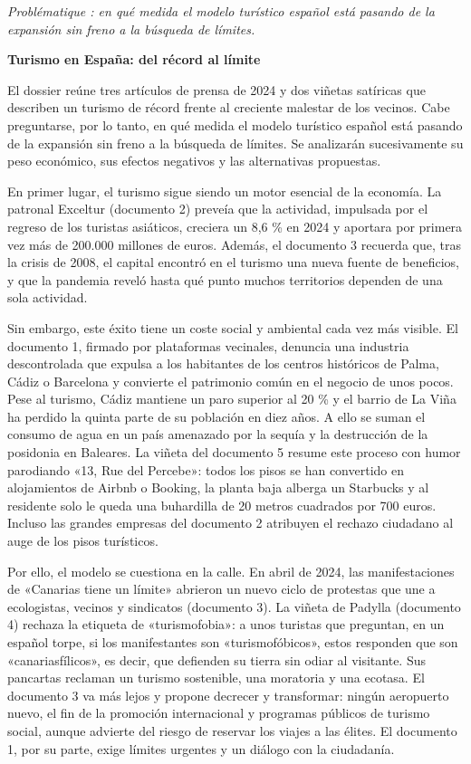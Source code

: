 \documentclass[11pt,a4paper]{article}
\begin{document}
\emph{Problématique : en qué medida el modelo turístico español está pasando de la expansión sin freno a la búsqueda de límites.}

\textbf{Turismo en España: del récord al límite}

El dossier reúne tres artículos de prensa de 2024 y dos viñetas satíricas que describen un turismo de récord frente al creciente malestar de los vecinos. Cabe preguntarse, por lo tanto, en qué medida el modelo turístico español está pasando de la expansión sin freno a la búsqueda de límites. Se analizarán sucesivamente su peso económico, sus efectos negativos y las alternativas propuestas.

En primer lugar, el turismo sigue siendo un motor esencial de la economía. La patronal Exceltur (documento 2) preveía que la actividad, impulsada por el regreso de los turistas asiáticos, creciera un 8,6 \% en 2024 y aportara por primera vez más de 200.000 millones de euros. Además, el documento 3 recuerda que, tras la crisis de 2008, el capital encontró en el turismo una nueva fuente de beneficios, y que la pandemia reveló hasta qué punto muchos territorios dependen de una sola actividad.

Sin embargo, este éxito tiene un coste social y ambiental cada vez más visible. El documento 1, firmado por plataformas vecinales, denuncia una industria descontrolada que expulsa a los habitantes de los centros históricos de Palma, Cádiz o Barcelona y convierte el patrimonio común en el negocio de unos pocos. Pese al turismo, Cádiz mantiene un paro superior al 20 \% y el barrio de La Viña ha perdido la quinta parte de su población en diez años. A ello se suman el consumo de agua en un país amenazado por la sequía y la destrucción de la posidonia en Baleares. La viñeta del documento 5 resume este proceso con humor parodiando «13, Rue del Percebe»: todos los pisos se han convertido en alojamientos de Airbnb o Booking, la planta baja alberga un Starbucks y al residente solo le queda una buhardilla de 20 metros cuadrados por 700 euros. Incluso las grandes empresas del documento 2 atribuyen el rechazo ciudadano al auge de los pisos turísticos.

Por ello, el modelo se cuestiona en la calle. En abril de 2024, las manifestaciones de «Canarias tiene un límite» abrieron un nuevo ciclo de protestas que une a ecologistas, vecinos y sindicatos (documento 3). La viñeta de Padylla (documento 4) rechaza la etiqueta de «turismofobia»: a unos turistas que preguntan, en un español torpe, si los manifestantes son «turismofóbicos», estos responden que son «canariasfílicos», es decir, que defienden su tierra sin odiar al visitante. Sus pancartas reclaman un turismo sostenible, una moratoria y una ecotasa. El documento 3 va más lejos y propone decrecer y transformar: ningún aeropuerto nuevo, el fin de la promoción internacional y programas públicos de turismo social, aunque advierte del riesgo de reservar los viajes a las élites. El documento 1, por su parte, exige límites urgentes y un diálogo con la ciudadanía.
\end{document}
